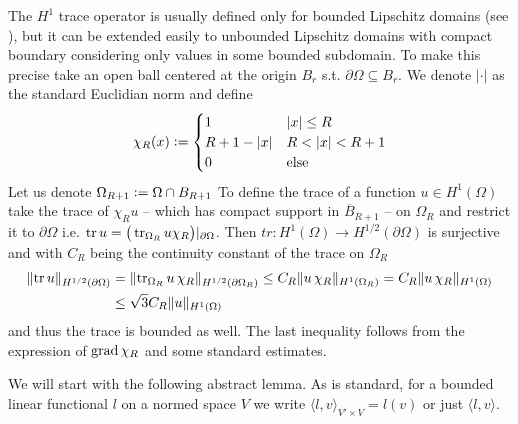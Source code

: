 \documentclass[../main.tex]{subfiles}
\begin{document}
\begin{remark}
    The $H^1$ trace operator is usually defined only for bounded Lipschitz domains 
    (see \cite[Thm.\,3.9]{monk}), but it can be extended easily to unbounded Lipschitz domains with 
    compact boundary considering only values in some bounded subdomain. 
    To make this precise take an open ball centered at the origin $B_r$
    s.t. $\partial \Omega \subseteq B_r$. We denote $|\cdot |$ as the standard 
    Euclidian norm and
    define 
    \begin{align*}
        \chi_R(x) \vcentcolon= 
        \begin{cases}
            1 & |x| \leq R
            \\ R + 1 - |x| & R < |x| < R+1
            \\ 0 & \text{else}
        \end{cases}        
    \end{align*}
    Let us denote 
    $\Omega_{R+1} \vcentcolon=  \Omega \cap B_{R+1}$
    To define the trace of a function $u \in H^1(\Omega)$ take the trace of
    $\chi_R u$ -- which has compact support in $\overline{B}_{R+1}$ -- 
    on $\Omega_R$ and restrict it to $\partial \Omega$ 
    i.e. $\operatorname{tr} u = \big( \operatorname{tr}_{\Omega_R} u\chi_R \big)|_{\partial \Omega}$.
    Then $tr: H^1(\Omega) \rightarrow H^{1/2}(\partial \Omega)$ is 
    surjective and with $C_R$ being the continuity constant of the trace on $\Omega_R$
    \begin{align*}
        \lVert \operatorname{tr} u \rVert _{H^{1/2}(\partial \Omega)}
        &= \lVert \operatorname{tr}_{\Omega_R} u\,\chi_R  \rVert _{H^{1/2}(\partial \Omega_R)}
        \leq C_R \lVert u\,\chi_R  \rVert _{H^1(\Omega_R)}
        = C_R \lVert u\,\chi_R  \rVert _{H^1(\Omega)}
        \\ &\leq \sqrt{3} C_R \lVert u  \rVert _{H^1(\Omega)}
    \end{align*}
    and thus the trace is bounded as well. The last inequality follows from 
    the expression of $\operatorname{grad} \chi_R$ and some standard estimates.
\end{remark}

We will start with the following abstract lemma. As is standard, for a bounded linear 
functional $l$ on a normed space $V$ we write $\langle l, v \rangle_{V'\times V} = l(v)$ 
or just $\langle l, v \rangle$.
\end{document}
